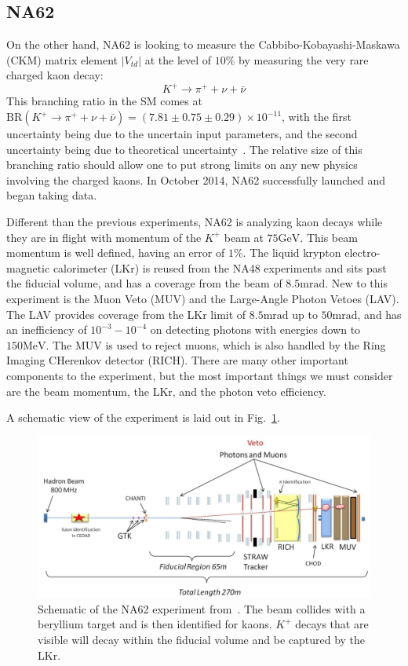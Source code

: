 \subsection{NA62}
On the other hand, NA62 is looking to measure the Cabbibo-Kobayashi-Maskawa (CKM) matrix element $|V_{td}|$ at the level of $10\%$ by measuring the very rare charged kaon decay:
\begin{equation}
K^+ \rightarrow \pi^+ + \nu + \bar{\nu}
\end{equation}
This branching ratio in the SM comes at $\textrm{BR}(K^+ \rightarrow \pi^+ + \nu + \bar{\nu}) = (7.81 \pm 0.75 \pm 0.29) \times 10^{-11}$, with the first uncertainty being due to the uncertain input parameters, and the second uncertainty being due to theoretical uncertainty~\cite{Straub:2010ih}.
The relative size of this branching ratio should allow one to put strong limits on any new physics involving the charged kaons.
In October 2014, NA62 successfully launched and began taking data.

Different than the previous experiments, NA62 is analyzing kaon decays while they are in flight with momentum of the $K^+$ beam at $75\textrm{GeV}$.
This beam momentum is well defined, having an error of $1\%$.
The liquid krypton electro-magnetic calorimeter (LKr) is reused from the NA48 experiments and sits past the fiducial volume, and has a coverage from the beam of $8.5\textrm{mrad}$.
New to this experiment is the Muon Veto (MUV) and the Large-Angle Photon Vetoes (LAV).
The LAV provides coverage from the LKr limit of $8.5\textrm{mrad}$ up to $50\textrm{mrad}$, and has an inefficiency of $10^{-3} - 10^{-4}$ on detecting photons with energies down to $150\textrm{MeV}$.
The MUV is used to reject muons, which is also handled by the Ring Imaging CHerenkov detector (RICH).
There are many other important components to the experiment, but the most important things we must consider are the beam momentum, the LKr, and the photon veto efficiency.

A schematic view of the experiment is laid out in Fig.~\ref{fig:na62_experiment}.

\begin{figure}[h]
    \centering
    \includegraphics[width=\textwidth]{Figures/experiments/na62_schematic}
    \caption{Schematic of the NA62 experiment from~\cite{Martellotti:2015kna}. The beam collides with a beryllium target and is then identified for kaons. $K^+$ decays that are visible will decay within the fiducial volume and be captured by the LKr.}
    \label{fig:na62_experiment}
\end{figure}
